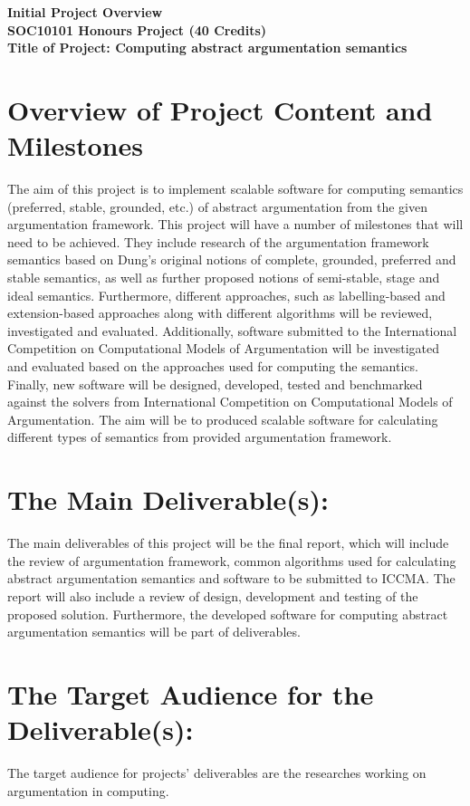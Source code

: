 \textbf{Initial Project Overview} \\
\textbf{SOC10101 Honours Project (40 Credits)}             \\                                          
\textbf{Title of Project: Computing abstract argumentation semantics }\\

\section{Overview of Project Content and Milestones}
The aim of this project is to implement scalable software for computing semantics (preferred, stable, grounded, etc.) of abstract argumentation from the given argumentation framework. This project will have a number of milestones that will need to be achieved. They include research of the argumentation framework semantics based on Dung’s original notions of complete, grounded, preferred and stable semantics, as well as further proposed notions of semi-stable, stage and ideal semantics. Furthermore, different approaches, such as labelling-based and extension-based approaches along with different algorithms will be reviewed, investigated and evaluated. Additionally, software submitted to the International Competition on Computational Models of Argumentation will be investigated and evaluated based on the approaches used for computing the semantics. Finally, new software will be designed, developed, tested and benchmarked against the solvers from International Competition on Computational Models of Argumentation. The aim will be to produced scalable software for calculating different types of semantics from provided argumentation framework.

\section{The Main Deliverable(s):}
The main deliverables of this project will be the final report, which will include the review of argumentation framework, common algorithms used for calculating abstract argumentation semantics and software to be submitted to ICCMA. The report will also include a review of design, development and testing of the proposed solution. Furthermore, the developed software for computing abstract argumentation semantics will be part of deliverables.

\section{The Target Audience for the Deliverable(s):}
The target audience for projects’ deliverables are the researches working on argumentation in computing.

